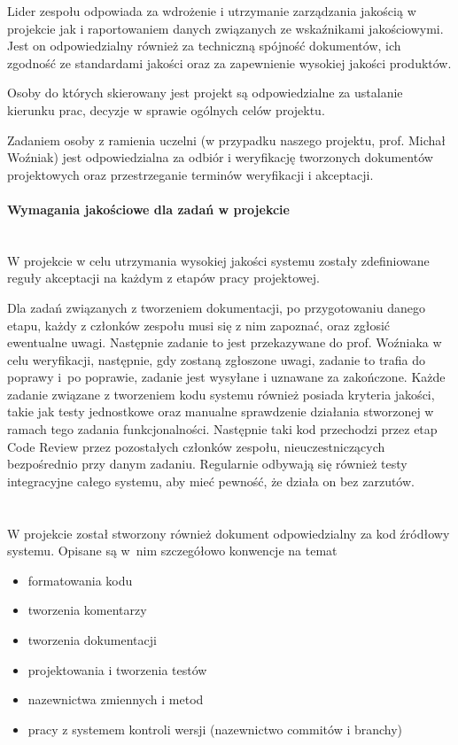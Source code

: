 \documentclass{article}
\begin{document}
Lider zespołu odpowiada za wdrożenie i utrzymanie zarządzania jakością w projekcie jak i raportowaniem danych związanych ze wskaźnikami jakościowymi. Jest on odpowiedzialny również za techniczną spójność dokumentów, ich zgodność ze standardami jakości oraz za zapewnienie wysokiej jakości produktów.

Osoby do których skierowany jest projekt są odpowiedzialne za ustalanie kierunku prac, decyzje w sprawie ogólnych celów projektu.

Zadaniem osoby z ramienia uczelni (w przypadku naszego projektu, prof. Michał Woźniak) jest odpowiedzialna za odbiór i weryfikację tworzonych dokumentów projektowych oraz przestrzeganie terminów weryfikacji i akceptacji.

\paragraph{Wymagania jakościowe dla zadań w projekcie}\mbox{}\\

W projekcie w celu utrzymania wysokiej jakości systemu zostały zdefiniowane reguły akceptacji na każdym z etapów pracy projektowej. 

Dla zadań związanych z tworzeniem dokumentacji, po przygotowaniu danego etapu, każdy z członków zespołu musi się z nim zapoznać, oraz zgłosić ewentualne uwagi. Następnie zadanie to jest przekazywane do prof. Woźniaka w celu weryfikacji, następnie, gdy zostaną zgłoszone uwagi, zadanie to trafia do poprawy i~po poprawie, zadanie jest wysyłane i uznawane za zakończone. 
Każde zadanie związane z tworzeniem kodu systemu również posiada kryteria jakości, takie jak testy jednostkowe oraz manualne sprawdzenie działania stworzonej w ramach tego zadania funkcjonalności. Następnie taki kod przechodzi przez etap Code Review przez pozostałych członków zespołu, nieuczestniczących bezpośrednio przy danym zadaniu.
Regularnie odbywają się również testy integracyjne całego systemu, aby mieć pewność, że działa on bez zarzutów.
\mbox{}\\\mbox{}\\\mbox{}\\

W projekcie został stworzony również dokument odpowiedzialny za kod źródłowy systemu. Opisane są w~nim szczegółowo konwencje na temat
\begin{itemize}
\item formatowania kodu
\item tworzenia komentarzy
\item tworzenia dokumentacji
\item projektowania i tworzenia testów
\item nazewnictwa zmiennych i metod
\item pracy z systemem kontroli wersji (nazewnictwo commitów i branchy)
\end{itemize}
\end{document}
